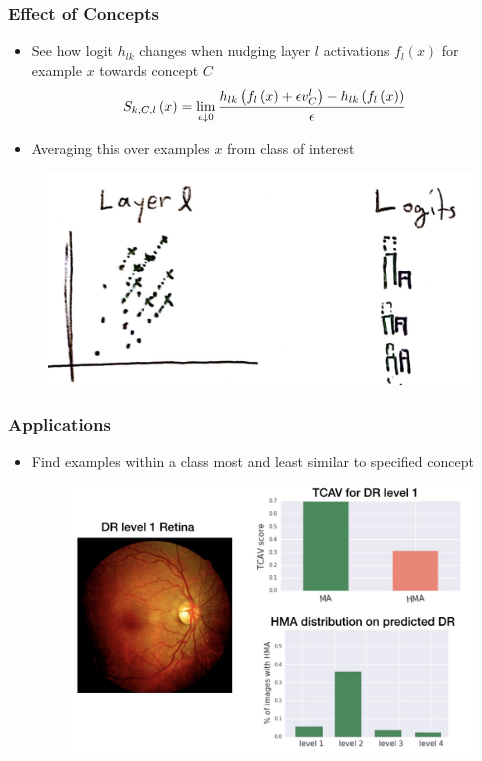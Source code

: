 \documentclass[10pt,mathserif]{beamer}
\begin{document}
\begin{frame}
  \frametitle{Effect of Concepts}
  \begin{itemize}
  \item See how logit $h_{lk}$ changes when nudging layer $l$ activations
    $f_{l}\left(x\right)$ for example $x$ towards concept $C$
    \begin{align*}
      S_{k, C, l}\left(x\right) &= \lim_{\epsilon \downarrow 0} \frac{h_{lk}\left(f_{l}\left(x\right) + \epsilon v_{C}^l\right) - h_{lk}\left(f_l\left(x\right)\right)}{\epsilon}
    \end{align*} 
  \item Averaging this over examples $x$ from class of interest
  \end{itemize} 
\begin{figure}[ht]
  \centering
  \includegraphics[width=0.6\paperwidth]{figure/cav_derivs}
  \caption{\label{fig:cav_derivs} }
\end{figure}
\end{frame}

\begin{frame}
  \frametitle{Applications}
  \begin{itemize}
  \item Find examples within a class most and least similar to specified concept
    \begin{figure}[ht]
      \centering
      \includegraphics[width=0.7\paperwidth]{figure/cav_app1}
      \caption{\label{fig:cav_app1} }
    \end{figure}
  \end{itemize}  
\end{frame}
\end{document}

